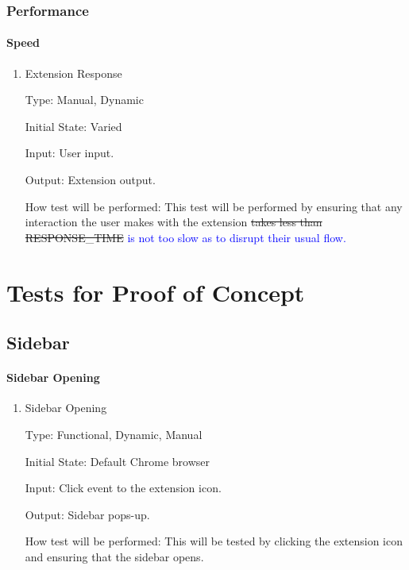 \documentclass[12pt, titlepage]{article}
\begin{document}
\subsubsection{Performance}

\paragraph{Speed}

\begin{enumerate}
	
	\item{Extension Response\\}
	
	Type: Manual, Dynamic
	
	Initial State: Varied
	
	Input: User input.
	
	Output: Extension output.
	
	How test will be performed: This test will be performed by ensuring that any interaction 
	the user makes with the extension \sout{takes less than RESPONSE\_TIME} 
	\textcolor{blue}{is not too slow as to disrupt their usual flow.}
	
\end{enumerate}

\section{Tests for Proof of Concept}

\subsection{Sidebar}
		
\paragraph{Sidebar Opening}

\begin{enumerate}

\item{Sidebar Opening\\}

Type: Functional, Dynamic, Manual
					
Initial State: Default Chrome browser
					
Input: Click event to the extension icon.
					
Output: Sidebar pops-up.
					
How test will be performed: This will be tested by clicking the extension icon and ensuring 
that the sidebar opens. 

\end{enumerate}
\end{document}
